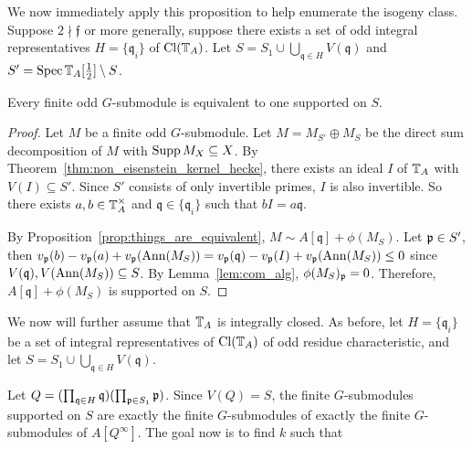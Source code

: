 \documentclass{article}
\renewcommand{\q}{\mathfrak{q}}
\begin{document}
We now immediately apply this proposition to help enumerate the isogeny class.
Suppose $2\nmid \mathfrak{f}$ or more generally, suppose there exists a set of
odd integral representatives $H=\{\q_i\}$ of $\operatorname{Cl}(\mathbb{T}_A)$. Let
${S=S_1\cup\bigcup_{\q\in H}V(\q)}$ and $S'=\operatorname{Spec} \mathbb{T}_A[\frac{1}{2}]\setminus S$.

\begin{corollary}%
    \label{cor:bound_support}
    Every finite odd $G$-submodule is equivalent to one supported on $S$.
\end{corollary}
\begin{proof}
    Let $M$ be a finite odd $G$-submodule. Let $M=M_{S'}\oplus M_S$ be the
    direct sum decomposition of $M$ with $\operatorname{Supp} M_X \subseteq X$. By
    Theorem~\ref{thm:non_eisenstein_kernel_hecke}, there exists an ideal
    $I$ of $\mathbb{T}_A$ with $V(I)\subseteq S'$. Since $S'$ consists of only
    invertible primes, $I$ is also invertible. So there exists $a,b\in \mathbb{T}_A
    ^\times$ and $\q\in \{\q_i\}$ such that $bI = a\q$.

    By Proposition~\ref{prop:things_are_equivalent}, $M\sim A[\q]+\phi(M_S)$.
    Let $\mathfrak{p}\in S'$, then
    $v_\p(b)-v_\p(a)+v_\p(\Ann(M_S))=v_\p(\q)-v_\p(I)+v_\p(\Ann(M_S)) \leq 0$
    since $V(\q),V(\Ann(M_S))\subseteq S$. By Lemma~\ref{lem:com_alg},
    $\phi(M_S)_{\mathfrak{p}} = 0$. Therefore, $A[\q]+\phi(M_S)$ is supported on $S$.
\end{proof}

We now will further assume that $\mathbb{T}_A$ is integrally closed. As before, let
$H=\{\q_i\}$ be a set of integral representatives of $\operatorname{Cl}(\mathbb{T}_A)$ of odd
residue characteristic, and let ${S=S_1\cup\bigcup_{\q\in H}V(\q)}$.

Let $Q = (\prod_{\q\in H} \q)(\prod_{\p\in S_1} \p)$. Since $V(Q)=S$, the finite
$G$-submodules supported on $S$ are exactly the finite $G$-submodules of
exactly the finite $G$-submodules of $A[Q^\infty]$. The goal now is to find $k$
such that 
\end{document}
